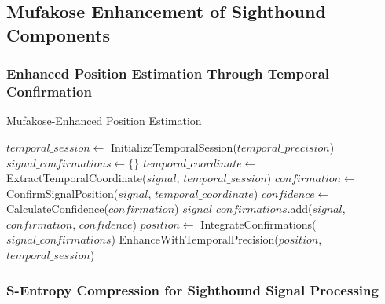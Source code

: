 \documentclass[12pt,a4paper]{article}
\begin{document}
\subsection{Mufakose Enhancement of Sighthound Components}

\subsubsection{Enhanced Position Estimation Through Temporal Confirmation}

\begin{algorithm}
\caption{Mufakose-Enhanced Position Estimation}
\begin{algorithmic}
    \State $temporal\_session \gets$ InitializeTemporalSession($temporal\_precision$)
    \State $signal\_confirmations \gets \{\}$
        \State $temporal\_coordinate \gets$ ExtractTemporalCoordinate($signal$, $temporal\_session$)
        \State $confirmation \gets$ ConfirmSignalPosition($signal$, $temporal\_coordinate$)
        \State $confidence \gets$ CalculateConfidence($confirmation$)
        \State $signal\_confirmations$.add($signal$, $confirmation$, $confidence$)
    \EndFor
    \State $position \gets$ IntegrateConfirmations($signal\_confirmations$)
    \State \Return EnhanceWithTemporalPrecision($position$, $temporal\_session$)
\EndProcedure
\end{algorithmic}
\end{algorithm}

\subsubsection{S-Entropy Compression for Sighthound Signal Processing}
\end{document}
